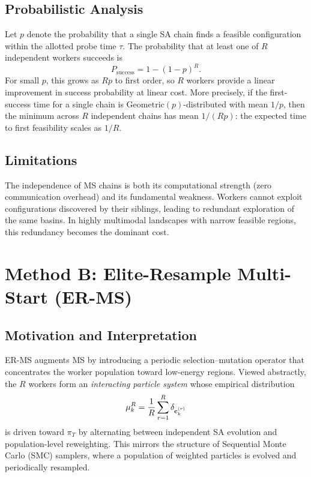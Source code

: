 \subsection{Probabilistic Analysis}

Let $p$ denote the probability that a single SA chain finds a feasible
configuration within the allotted probe time $\tau$.
The probability that at least one of $R$ independent workers succeeds is
\[
  P_{\mathrm{success}} = 1 - (1-p)^R.
\]
For small $p$, this grows as $Rp$ to first order, so $R$ workers provide
a linear improvement in success probability at linear cost.
More precisely, if the first-success time for a single chain is
$\mathrm{Geometric}(p)$-distributed with mean $1/p$, then the minimum
across $R$ independent chains has mean $1/(Rp)$: the expected time to
first feasibility scales as $1/R$.

\subsection{Limitations}

The independence of MS chains is both its computational strength
(zero communication overhead) and its fundamental weakness.
Workers cannot exploit configurations discovered by their siblings,
leading to redundant exploration of the same basins.
In highly multimodal landscapes with narrow feasible regions, this
redundancy becomes the dominant cost.

\section{Method B: Elite-Resample Multi-Start (ER-MS)}
\label{sec:erms}

\subsection{Motivation and Interpretation}

ER-MS augments MS by introducing a periodic selection--mutation operator
that concentrates the worker population toward low-energy regions.
Viewed abstractly, the $R$ workers form an \emph{interacting particle system}
whose empirical distribution
\[
  \mu_k^R = \frac{1}{R}\sum_{r=1}^R \delta_{\mathbf{c}_k^{(r)}}
\]
is driven toward $\pi_T$ by alternating between independent SA evolution
and population-level reweighting. This mirrors the structure of
Sequential Monte Carlo (SMC) samplers, where a population of weighted
particles is evolved and periodically resampled.


